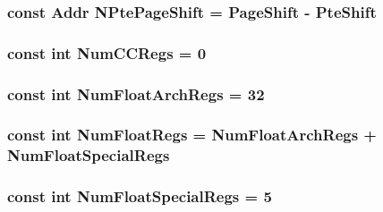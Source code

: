 \label{namespaceMipsISA_ae295358052b4e754e08cd5cd763c212a}
\hypertarget{namespaceMipsISA_a9f060ccda225dfb28dff712695adab46}{
\subsubsection[{NPtePageShift}]{\setlength{\rightskip}{0pt plus 5cm}const {\bf Addr} {\bf NPtePageShift} = {\bf PageShift} -\/ {\bf PteShift}}}
\label{namespaceMipsISA_a9f060ccda225dfb28dff712695adab46}
\hypertarget{namespaceMipsISA_a717317b863009b3e1b683c3bdddb9fd3}{
\subsubsection[{NumCCRegs}]{\setlength{\rightskip}{0pt plus 5cm}const int {\bf NumCCRegs} = 0}}
\label{namespaceMipsISA_a717317b863009b3e1b683c3bdddb9fd3}
\hypertarget{namespaceMipsISA_a9ec947def3616ab9415089776195fa09}{
\subsubsection[{NumFloatArchRegs}]{\setlength{\rightskip}{0pt plus 5cm}const int {\bf NumFloatArchRegs} = 32}}
\label{namespaceMipsISA_a9ec947def3616ab9415089776195fa09}
\hypertarget{namespaceMipsISA_a627b25288f2452be107872a138df8b85}{
\subsubsection[{NumFloatRegs}]{\setlength{\rightskip}{0pt plus 5cm}const int {\bf NumFloatRegs} = {\bf NumFloatArchRegs} + {\bf NumFloatSpecialRegs}}}
\label{namespaceMipsISA_a627b25288f2452be107872a138df8b85}
\hypertarget{namespaceMipsISA_a49908eb80616530afc519599ec46e42e}{
\subsubsection[{NumFloatSpecialRegs}]{\setlength{\rightskip}{0pt plus 5cm}const int {\bf NumFloatSpecialRegs} = 5}}
